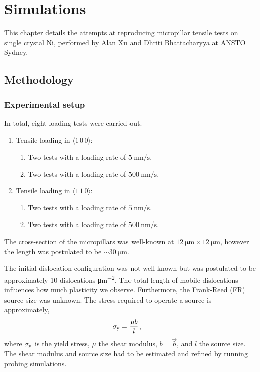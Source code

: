 \chapter{Simulations}\label{c:simulations}

This chapter details the attempts at reproducing micropillar tensile tests on single crystal Ni, performed by Alan Xu and Dhriti Bhattacharyya at ANSTO Sydney.

\section{Methodology}

\subsection{Experimental setup}
\label{ss:experimentalSetup}

In total, eight loading tests were carried out.
\begin{enumerate}
    \item Tensile loading in $\langle 1\, 0\, 0 \rangle$:
          \begin{enumerate}
              \item Two tests with a loading rate of $\SI{5}{\nano\metre\per\second}$.
              \item Two tests with a loading rate of $\SI{500}{\nano\metre\per\second}$.
          \end{enumerate}
    \item Tensile loading in $\langle 1\, 1\, 0 \rangle$:
          \begin{enumerate}
              \item Two tests with a loading rate of $\SI{5}{\nano\metre\per\second}$.
              \item Two tests with a loading rate of $\SI{500}{\nano\metre\per\second}$.
          \end{enumerate}
\end{enumerate}

The cross-section of the micropillars was well-known at $\SI{12}{\micro\metre} \times \SI{12}{\micro\metre}$, however the length was postulated to be $\sim \SI{30}{\micro\metre}$.

The initial dislocation configuration was not well known but was postulated to be approximately 10 dislocations \si{\micro\metre^{-2}}. The total length of mobile dislocations influences how much plasticity we observe. Furthermore, the Frank-Reed (FR) source size was unknown. The stress required to operate a source is approximately,
\begin{align}\label{eq:yieldStress}
    \sigma_{\textrm{y}} & = \dfrac{\mu b}{l}\,,
\end{align}
where $\sigma_{\textrm{y}}$ is the yield stress, $\mu$ the shear modulus, $b = \vec{b} $, and $l$ the source size. The shear modulus and source size had to be estimated and refined by running probing simulations.

